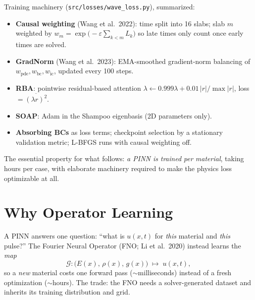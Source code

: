 \documentclass[11pt,a4paper]{article}
\begin{document}
Training machinery (\texttt{src/losses/wave\_loss.py}), summarized:
\begin{itemize}[nosep]
  \item \textbf{Causal weighting} (Wang et al.\ 2022): time split into 16 slabs;
        slab $m$ weighted by $w_m = \exp\bigl(-\varepsilon \sum_{k<m} L_k\bigr)$
        so late times only count once early times are solved.
  \item \textbf{GradNorm} (Wang et al.\ 2023): EMA-smoothed gradient-norm
        balancing of $w_{\mathrm{pde}}, w_{\mathrm{bc}}, w_{\mathrm{ic}}$, updated every 100 steps.
  \item \textbf{RBA}: pointwise residual-based attention
        $\lambda \leftarrow 0.999\lambda + 0.01\,|r|/\max|r|$, loss $=\overline{(\lambda r)^2}$.
  \item \textbf{SOAP}: Adam in the Shampoo eigenbasis (2D parameters only).
  \item \textbf{Absorbing BCs} as loss terms; checkpoint selection by a
        stationary validation metric; L-BFGS runs with causal weighting off.
\end{itemize}

The essential property for what follows: \emph{a PINN is trained per material},
taking hours per case, with elaborate machinery required to make the physics
loss optimizable at all.

\section{Why Operator Learning}

A PINN answers one question: ``what is $u(x,t)$ for \emph{this} material and
\emph{this} pulse?'' The Fourier Neural Operator (FNO; Li et al.\ 2020) instead
learns the \emph{map}
\begin{equation}
  \mathcal{G}: \bigl(E(x),\, \rho(x),\, g(x)\bigr) \;\longmapsto\; u(x,t),
\end{equation}
so a \emph{new} material costs one forward pass ($\sim$milliseconds) instead of
a fresh optimization ($\sim$hours). The trade: the FNO needs a solver-generated
dataset and inherits its training distribution and grid.
\end{document}
